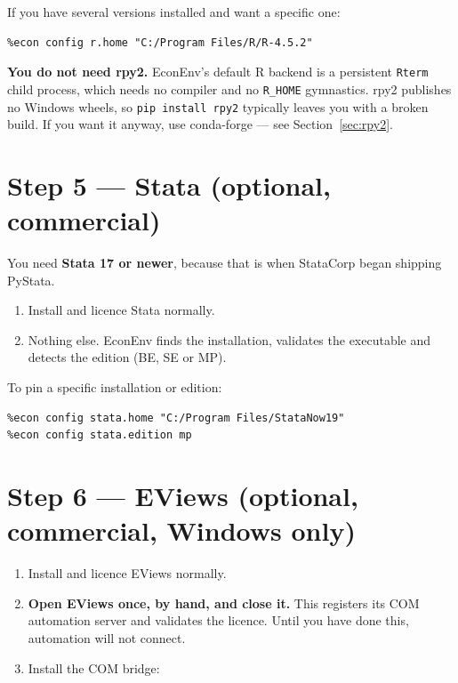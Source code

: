 \documentclass[11pt,a4paper]{report}
\begin{document}
If you have several versions installed and want a specific one:

\begin{lstlisting}
%econ config r.home "C:/Program Files/R/R-4.5.2"
\end{lstlisting}

\begin{note}
\textbf{You do not need rpy2.} EconEnv's default R backend is a persistent
\texttt{Rterm} child process, which needs no compiler and no \texttt{R\_HOME}
gymnastics. rpy2 publishes no Windows wheels, so \texttt{pip install rpy2}
typically leaves you with a broken build. If you want it anyway, use
conda-forge --- see Section~\ref{sec:rpy2}.
\end{note}

\section{Step 5 --- Stata (optional, commercial)}

You need \textbf{Stata 17 or newer}, because that is when StataCorp began
shipping PyStata.

\begin{enumerate}
  \item Install and licence Stata normally.
  \item Nothing else. EconEnv finds the installation, validates the executable
        and detects the edition (BE, SE or MP).
\end{enumerate}

To pin a specific installation or edition:

\begin{lstlisting}
%econ config stata.home "C:/Program Files/StataNow19"
%econ config stata.edition mp
\end{lstlisting}

\section{Step 6 --- EViews (optional, commercial, Windows only)}

\begin{enumerate}
  \item Install and licence EViews normally.
  \item \textbf{Open EViews once, by hand, and close it.} This registers its
        COM automation server and validates the licence. Until you have done
        this, automation will not connect.
  \item Install the COM bridge:
\end{enumerate}
\end{document}
